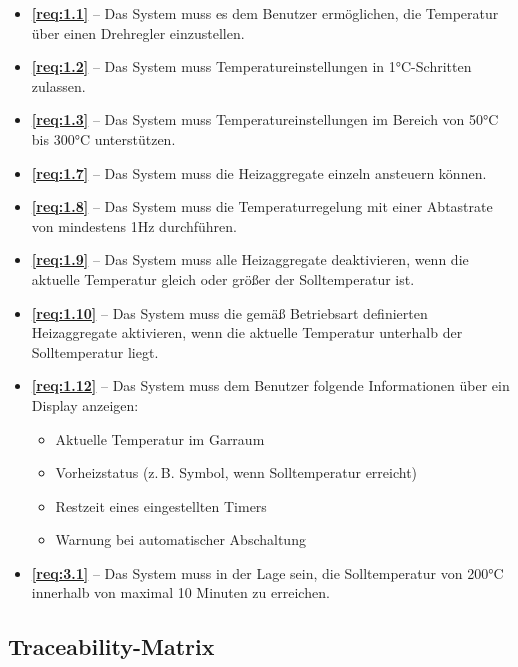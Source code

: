 \documentclass[a4paper,12pt]{article}
\begin{document}
\begin{itemize}
    \item \textbf{\ref{req:1.1}} – Das System muss es dem Benutzer ermöglichen, die Temperatur über einen Drehregler einzustellen.
    \item \textbf{\ref{req:1.2}} – Das System muss Temperatureinstellungen in 1°C-Schritten zulassen.
    \item \textbf{\ref{req:1.3}} – Das System muss Temperatureinstellungen im Bereich von 50°C bis 300°C unterstützen.
    \item \textbf{\ref{req:1.7}} – Das System muss die Heizaggregate einzeln ansteuern können.
    \item \textbf{\ref{req:1.8}} – Das System muss die Temperaturregelung mit einer Abtastrate von mindestens 1Hz durchführen.
    \item \textbf{\ref{req:1.9}} – Das System muss alle Heizaggregate deaktivieren, wenn die aktuelle Temperatur gleich oder größer der Solltemperatur ist.
    \item \textbf{\ref{req:1.10}} – Das System muss die gemäß Betriebsart definierten Heizaggregate aktivieren, wenn die aktuelle Temperatur unterhalb der Solltemperatur liegt.
    \item \textbf{\ref{req:1.12}} – Das System muss dem Benutzer folgende Informationen über ein Display anzeigen:
    \begin{itemize}
        \item Aktuelle Temperatur im Garraum
        \item Vorheizstatus (z.\,B. Symbol, wenn Solltemperatur erreicht)
        \item Restzeit eines eingestellten Timers
        \item Warnung bei automatischer Abschaltung
    \end{itemize}
    \item \textbf{\ref{req:3.1}} – Das System muss in der Lage sein, die Solltemperatur von 200°C innerhalb von maximal 10 Minuten zu erreichen.
\end{itemize}

\subsection{Traceability-Matrix}
\end{document}
